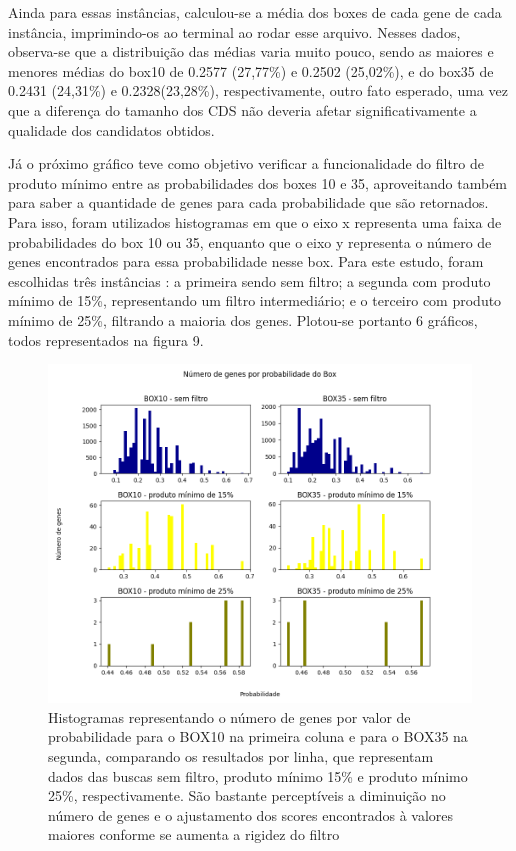 \documentclass[brazilian,12pt,a4paper,final]{article}
\begin{document}
	 \vspace{0.5cm}
	
	Ainda para essas instâncias, calculou-se a média dos boxes de cada gene de cada instância, imprimindo-os ao terminal ao rodar esse arquivo. Nesses dados, observa-se que a distribuição das médias varia muito pouco, sendo as maiores e menores médias do box10 de 0.2577 (27,77\%) e 0.2502 (25,02\%), e do box35 de 0.2431 (24,31\%) e 0.2328(23,28\%), respectivamente, outro fato esperado, uma vez que a diferença do tamanho dos CDS não deveria afetar significativamente a qualidade dos candidatos obtidos.
	
	 \vspace{0.5cm}
	
	Já o próximo gráfico teve como objetivo verificar a funcionalidade do filtro de produto mínimo entre as probabilidades dos boxes 10 e 35, aproveitando também para saber a quantidade de genes para cada probabilidade que são retornados. Para isso, foram utilizados histogramas em que o eixo x representa uma faixa de probabilidades do box 10 ou 35, enquanto que o eixo y representa o número de genes encontrados para essa probabilidade nesse box. Para este estudo, foram escolhidas três instâncias : a primeira sendo sem filtro; a segunda com produto mínimo de 15\%, representando um filtro intermediário; e o terceiro com produto mínimo de 25\%, filtrando a maioria dos genes. Plotou-se portanto 6 gráficos, todos representados na figura 9.
	
	\begin{figure}[hbtp]
		\begin{center}
			\includegraphics[width=15cm]{../Figures/FiltroPorcentagem.png}
			\caption{Histogramas representando o número de genes por valor de probabilidade para o BOX10 na primeira coluna e para o BOX35 na segunda, comparando os resultados por linha, que representam dados das buscas sem filtro, produto mínimo 15\% e produto mínimo 25\%, respectivamente. São bastante perceptíveis a diminuição no número de genes e o ajustamento dos scores encontrados à valores maiores conforme se aumenta a rigidez do filtro}
			\label{fig}
		\end{center}
	\end{figure}
	
\end{document}
